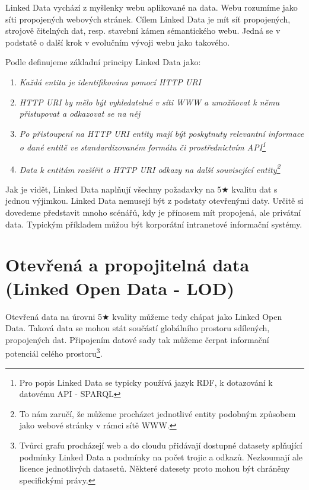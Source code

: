 Linked Data vychází z myšlenky webu aplikované na data. Webu rozumíme jako síti propojených webových stránek. Cílem Linked Data je mít síť propojených, strojově čitelných dat, resp. stavební kámen sémantického webu\cite{sw}. Jedná se v podstatě o další krok v evolučním vývoji webu jako takového.

Podle \cite{linkedData} definujeme základní principy Linked Data jako:

\begin{enumerate}
\item \textit{Každá entita je identifikována pomocí HTTP URI}   
\item \textit{HTTP URI by mělo být vyhledatelné v síti WWW a umožňovat k němu přistupovat a odkazovat se na něj}
\item \textit{Po přistoupení na HTTP URI entity mají být poskytnuty relevantní informace o dané entitě ve standardizovaném formátu či prostřednictvím API\footnote{Pro popis Linked Data se typicky používá jazyk RDF\cite{RdfConcepts}, k dotazování k datovému API - SPARQL\cite{Sparql}}}
\item \textit{Data k entitám rozšířit o HTTP URI odkazy na další související entity\footnote{To nám zaručí, že můžeme procházet jednotlivé entity podobným způsobem jako webové stránky v rámci sítě WWW.}}
\end{enumerate}

Jak je vidět, Linked Data naplňují všechny požadavky na 5$\bigstar$ kvalitu dat s jednou výjimkou. Linked Data nemusejí být z podstaty otevřenými daty. Určitě si dovedeme představit mnoho scénářů, kdy je přínosem mít propojená, ale privátní data. Typickým příkladem můžou být korporátní intranetové informační systémy. \cite{opendatacasestudy}

\section{Otevřená a propojitelná data (Linked Open Data - LOD)}

Otevřená data na úrovni 5$\bigstar$ kvality můžeme tedy chápat jako Linked Open Data. Taková data se mohou stát součástí globálního prostoru sdílených, propojených dat. Připojením datové sady tak můžeme čerpat informační potenciál celého prostoru\footnote{Tvůrci grafu procházejí web a do cloudu přidávají dostupné datasety splňující podmínky Linked Data a podmínky na počet trojic a odkazů. Nezkoumají ale licence jednotlivých datasetů. Některé datesety proto mohou být chráněny specifickými právy.\cite{cloud}}.


